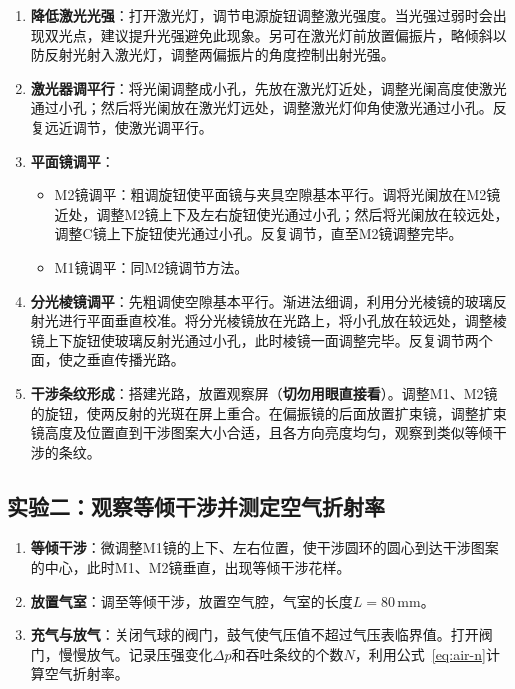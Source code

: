 \documentclass[UTF8]{article}
\begin{document}
\begin{enumerate}
    \item \textbf{降低激光光强}：打开激光灯，调节电源旋钮调整激光强度。当光强过弱时会出现双光点，建议提升光强避免此现象。另可在激光灯前放置偏振片，略倾斜以防反射光射入激光灯，调整两偏振片的角度控制出射光强。
    \item \textbf{激光器调平行}：将光阑调整成小孔，先放在激光灯近处，调整光阑高度使激光通过小孔；然后将光阑放在激光灯远处，调整激光灯仰角使激光通过小孔。反复远近调节，使激光调平行。
    \item \textbf{平面镜调平}：
    \begin{itemize}
        \item M2镜调平：粗调旋钮使平面镜与夹具空隙基本平行。调将光阑放在M2镜近处，调整M2镜上下及左右旋钮使光通过小孔；然后将光阑放在较远处，调整C镜上下旋钮使光通过小孔。反复调节，直至M2镜调整完毕。
        \item M1镜调平：同M2镜调节方法。
    \end{itemize}
    \item \textbf{分光棱镜调平}：先粗调使空隙基本平行。渐进法细调，利用分光棱镜的玻璃反射光进行平面垂直校准。将分光棱镜放在光路上，将小孔放在较远处，调整棱镜上下旋钮使玻璃反射光通过小孔，此时棱镜一面调整完毕。反复调节两个面，使之垂直传播光路。
    \item \textbf{干涉条纹形成}：搭建光路，放置观察屏（\textbf{切勿用眼直接看}）。调整M1、M2镜的旋钮，使两反射的光斑在屏上重合。在偏振镜的后面放置扩束镜，调整扩束镜高度及位置直到干涉图案大小合适，且各方向亮度均匀，观察到类似等倾干涉的条纹。
\end{enumerate}

\subsection{实验二：观察等倾干涉并测定空气折射率}

\begin{enumerate}
    \item \textbf{等倾干涉}：微调整M1镜的上下、左右位置，使干涉圆环的圆心到达干涉图案的中心，此时M1、M2镜垂直，出现等倾干涉花样。
    \item \textbf{放置气室}：调至等倾干涉，放置空气腔，气室的长度$L=80\,\mathrm{mm}$。
    \item \textbf{充气与放气}：关闭气球的阀门，鼓气使气压值不超过气压表临界值。打开阀门，慢慢放气。记录压强变化$\Delta p$和吞吐条纹的个数$N$，利用公式~\eqref{eq:air-n}计算空气折射率。
\end{enumerate}
\end{document}

